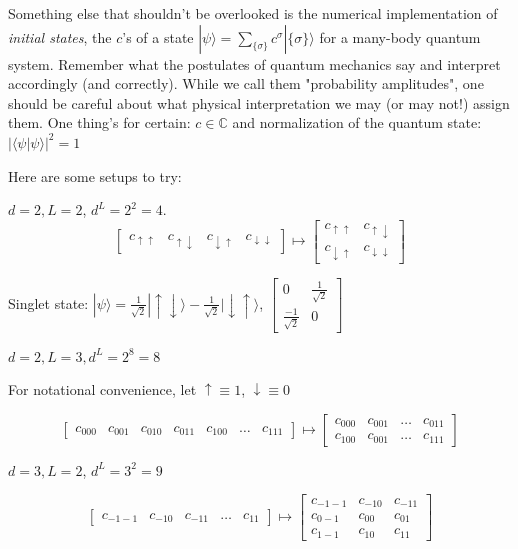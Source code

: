 Something else that shouldn't be overlooked is the numerical implementation of \emph{initial states}, the $c$'s of a state $| \psi \rangle = \sum_{ \lbrace \sigma \rbrace } c^{\sigma} | \lbrace \sigma \rbrace \rangle$ for a many-body quantum system. Remember what the postulates of quantum mechanics say and interpret accordingly (and correctly). While we call them "probability amplitudes", one should be careful about what physical interpretation we may (or may not!) assign them. One thing's for certain: $c \in \mathbb{C}$ and normalization of the quantum state: $ | \langle \psi | \psi \rangle |^2 = 1$

Here are some setups to try:

$d= 2, L=2$, $d^L = 2^2=4$.
\[
\left[ \begin{matrix} c_{\uparrow \uparrow} & c_{\uparrow \downarrow} & c_{\downarrow \uparrow} & c_{\downarrow \downarrow} \end{matrix} \right] \mapsto \left[ \begin{matrix} c_{\uparrow \uparrow} & c_{\uparrow \downarrow} \\
c_{\downarrow \uparrow} & c_{\downarrow \downarrow} \end{matrix} \right]
\]

Singlet state: $|\psi \rangle = \frac{1}{ \sqrt{2}} | \uparrow \downarrow \rangle -  \frac{1}{\sqrt{2}} | \downarrow \uparrow \rangle $, $\left[ \begin{matrix} 0 & \frac{1}{\sqrt{2}} \\ \frac{-1}{\sqrt{2}} & 0 \end{matrix} \right]$ 

$d=2, L=3, d^L = 2^8 = 8$

For notational convenience, let $\uparrow \equiv 1$, $\downarrow \equiv 0$

\[
\left[ \begin{matrix} c_{000} & c_{001} & c_{010} & c_{011} & c_{100} & \dots & c_{111}  \end{matrix} \right] \mapsto \left[ \begin{matrix} c_{000} & c_{001} & \dots & c_{011} \\
c_{100} & c_{001} & \dots & c_{111} \end{matrix} \right]
\]

$d=3, L=2$, $d^L = 3^2 = 9$

\[
\left[ \begin{matrix} c_{-1-1} & c_{-10 } & c_{-11} & \dots  & c_{11} \end{matrix} \right] \mapsto \left[ \begin{matrix} c_{-1-1} & c_{-10} &  c_{-11} \\
c_{0-1} & c_{00} &  c_{01} \\ 
c_{1-1} & c_{10} & c_{11} \end{matrix} \right]
\]













